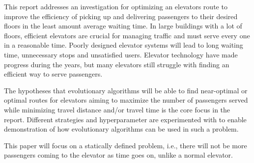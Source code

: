 
This report addresses an investigation for optimizing an elevators route to improve the efficiency of picking up and delivering passengers to their desired floors in the least amount average waiting time.
In large buildings with a lot of floors, efficient elevators are crucial for managing traffic and must serve every one in a reasonable time.
Poorly designed elevator systems will lead to long waiting time, unnecessary stops and unsatisfied users.
Elevator technology have made progress during the years, but many elevators still struggle with finding an efficient way
to serve passengers.

The hypotheses that evolutionary algorithms will be able to find near-optimal or optimal routes for elevators
aiming to maximize the number of passengers served while minimizing travel distance and/or travel time is
the core focus in the report. Different strategies and hyperparameter are experimented with to enable
demonstration of how evolutionary algorithms can be used in such a problem.

This paper will focus on a statically defined problem, i.e., there will not be more passengers coming to the elevator as time goes on, unlike a normal elevator.
